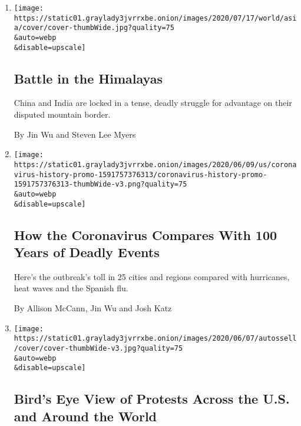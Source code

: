 \begin{enumerate}
\def\labelenumi{\arabic{enumi}.}
\item
  \href{/interactive/2020/07/18/world/asia/china-india-border-conflict.html}{}

  \texttt{[image: https://static01.graylady3jvrrxbe.onion/images/2020/07/17/world/asia/cover/cover-thumbWide.jpg?quality=75\\\&auto=webp\\\&disable=upscale]}

  \hypertarget{battle-in-the-himalayas}{%
  \subsection{Battle in the Himalayas}\label{battle-in-the-himalayas}}

  China and India are locked in a tense, deadly struggle for advantage
  on their disputed mountain border.

  By Jin Wu and Steven Lee Myers
\item
  \href{/interactive/2020/06/10/world/coronavirus-history.html}{}

  \texttt{[image: https://static01.graylady3jvrrxbe.onion/images/2020/06/09/us/coronavirus-history-promo-1591757376313/coronavirus-history-promo-1591757376313-thumbWide-v3.png?quality=75\\\&auto=webp\\\&disable=upscale]}

  \hypertarget{how-the-coronavirus-compares-with-100-years-of-deadly-events}{%
  \subsection{How the Coronavirus Compares With 100 Years of Deadly
  Events}\label{how-the-coronavirus-compares-with-100-years-of-deadly-events}}

  Here's the outbreak's toll in 25 cities and regions compared with
  hurricanes, heat waves and the Spanish flu.

  By Allison McCann, Jin Wu and Josh Katz
\item
  \href{/interactive/2020/06/07/us/george-floyd-protest-aerial-photos.html}{}

  \texttt{[image: https://static01.graylady3jvrrxbe.onion/images/2020/06/07/autossell/cover/cover-thumbWide-v3.jpg?quality=75\\\&auto=webp\\\&disable=upscale]}

  \hypertarget{birds-eye-view-of-protests-across-the-us-and-around-the-world}{%
  \subsection{Bird's Eye View of Protests Across the U.S. and Around the
  World}\label{birds-eye-view-of-protests-across-the-us-and-around-the-world}}


\end{enumerate}
